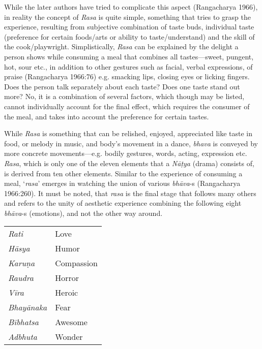 While the later authors have tried to complicate this aspect (Rangacharya 1966), in reality the concept of \textsl{Rasa} is quite simple, something that tries to grasp the experience, resulting from subjective combination of taste buds, individual taste (preference for certain foods/arts or ability to taste/understand) and the skill of the cook/playwright. Simplistically, \textsl{Rasa} can be explained by the delight a person shows while consuming a meal that combines all tastes---sweet, pungent, hot, sour etc., in addition to other gestures such as facial, verbal expressions, of praise (Rangacharya 1966:76) e.g. smacking lips, closing eyes or licking fingers. Does the person talk separately about each taste? Does one taste stand out more? No, it is a combination of several factors, which though may be listed, cannot individually account for the final effect, which requires the consumer of the meal, and takes into account the preference for certain tastes. 

\newpage

While \textsl{Rasa} is something that can be relished, enjoyed, appreciated like taste in food, or melody in music, and body’s movement in a dance, \textsl{bhava} is conveyed by more concrete movements---e.g. bodily gestures, words, acting, expression etc. \textsl{Rasa}, which is only one of the eleven elements that a \textsl{Nāṭya} (drama) consists of, is derived from ten other elements. Similar to the experience of consuming a meal, ‘\textsl{rasa}’ emerges in watching the union of various \textsl{bhāva}-s (Rangacharya 1966:260). It must be noted, that \textsl{rasa} is the final stage that follows many others and refers to the unity of aesthetic experience combining the following eight \textsl{bhāva}-s (emotions), and not the other way around. 
\begin{center}
\begin{tabular}{|l|l|}
\hline
\textsl{Rati} & Love\\
\textsl{Hāsya} & Humor\\
\textsl{Karuṇa} & Compassion\\
\textsl{Raudra} & Horror\\
\textsl{Vīra} & Heroic\\
\textsl{Bhayānaka} & Fear\\
\textsl{Bībhatsa} & Awesome\\
\textsl{Adbhuta} & Wonder\\
\hline
\end{tabular}
\end{center}

